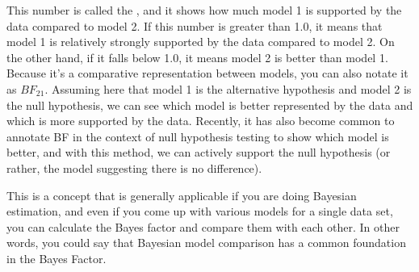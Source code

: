 \documentclass{ltjsbook}
\begin{document}
This number is called the , and it shows how much model 1 is supported by the data compared to model 2. If this number is greater than 1.0, it means that model 1 is relatively strongly supported by the data compared to model 2. On the other hand, if it falls below 1.0, it means model 2 is better than model 1. Because it's a comparative representation between models, you can also notate it as $BF_{21}$. Assuming here that model 1 is the alternative hypothesis and model 2 is the null hypothesis, we can see which model is better represented by the data and which is more supported by the data. Recently, it has also become common to annotate BF in the context of null hypothesis testing to show which model is better, and with this method, we can actively support the null hypothesis (or rather, the model suggesting there is no difference).

This is a concept that is generally applicable if you are doing Bayesian estimation, and even if you come up with various models for a single data set, you can calculate the Bayes factor and compare them with each other. In other words, you could say that Bayesian model comparison has a common foundation in the Bayes Factor.
\end{document}
